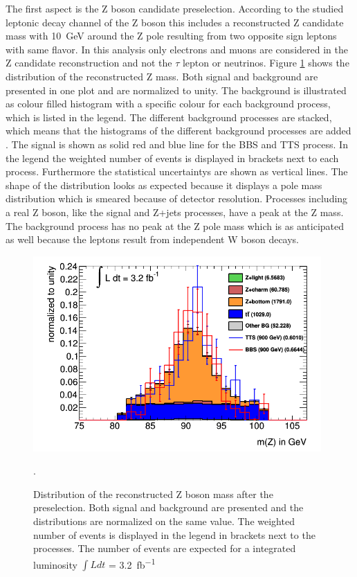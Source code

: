 The first aspect is the Z boson candidate preselection. 
According to the studied leptonic decay channel of the Z boson this includes a reconstructed Z candidate mass with \SI{10}{GeV} around the Z pole resulting from two opposite sign leptons with same flavor.
In this analysis only electrons and muons are considered in the Z candidate reconstruction and not the $\tau$ lepton or neutrinos.
Figure \ref{Zmass} shows the distribution of the reconstructed Z mass. 
Both signal and background are presented in one plot and are normalized to unity. 
The background is illustrated as colour filled histogram with a specific colour for each background process, which is listed in the legend.
The different background processes are stacked, which means that the histograms of the different background processes are added . 
The signal is shown as solid red and blue line for the BBS and TTS process.
In the legend the weighted number of events is displayed in brackets next to each process.
Furthermore the statistical uncertaintys are shown as vertical lines.
The shape of the distribution looks as expected because it displays a pole mass distribution which is smeared because of detector resolution.
Processes including a real Z boson, like the signal and Z+jets processes, have a peak at the Z mass. 
The \ttbar{} background process has no peak at the Z pole mass which is as anticipated as well because the leptons result from independent W boson decays.\\

\begin{figure}
\centering
\includegraphics[width=11cm]{figures/Zmass.png}
\caption{Distribution of the reconstructed Z boson mass after the preselection. 
Both signal and background are presented and the distributions are normalized on the same value.
The weighted number of events is displayed in the legend in brackets next to the processes. 
The number of events are expected for a integrated luminosity $\int{Ldt}$ = \SI{3,2}{fb^{-1}} }.
\label{Zmass}
\end{figure}

